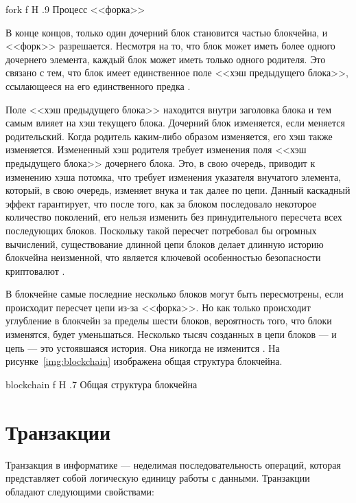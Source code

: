    {fork}
    {f}
    {H}
    {.9\textwidth}
    {Процесс <<форка>> \cite{Sheikh2018}}

\pagebreak
В конце концов, только один дочерний блок становится частью блокчейна, и <<форк>> разрешается. 
Несмотря на то, что блок может иметь более одного дочернего элемента, каждый блок может иметь только одного родителя. 
Это связано с тем, что блок имеет единственное поле <<хэш предыдущего блока>>, ссылающееся на его единственного предка \cite[163]{Antonopoulos2010}.

Поле <<хэш предыдущего блока>> находится внутри заголовка блока и тем самым влияет на хэш текущего блока. 
Дочерний блок изменяется, если меняется родительский. 
Когда родитель каким-либо образом изменяется, его хэш также изменяется. 
Измененный хэш родителя требует изменения поля <<хэш предыдущего блока>> дочернего блока. 
Это, в свою очередь, приводит к изменению хэша потомка, что требует изменения указателя внучатого элемента, который, в свою очередь, изменяет внука и так далее по цепи. 
Данный каскадный эффект гарантирует, что после того, как за блоком последовало некоторое количество поколений, его нельзя изменить без принудительного пересчета всех последующих блоков. 
Поскольку такой пересчет потребовал бы огромных вычислений, существование длинной цепи блоков делает длинную историю блокчейна неизменной, что является ключевой особенностью безопасности криптовалют \cite[164]{Antonopoulos2010}.

В блокчейне самые последние несколько блоков могут быть пересмотрены, если происходит пересчет цепи из-за <<форка>>. 
Но как только происходит углубление в блокчейн за пределы шести блоков, вероятность того, что блоки изменятся, будет уменьшаться. 
Несколько тысяч созданных в цепи блоков --- и цепь --- это устоявшаяся история. Она никогда не изменится \cite[164]{Antonopoulos2010}. 
На рисунке~\ref{img:blockchain} изображена общая структура блокчейна.

    {blockchain}
    {f}
    {H}
    {.7\textwidth}
    {Общая структура блокчейна \cite{Ribera2018}}

\section{Транзакции}

Транзакция в информатике --- неделимая последовательность операций, которая представляет собой логическую единицу работы с данными. 
Транзакции обладают следующими свойствами:

